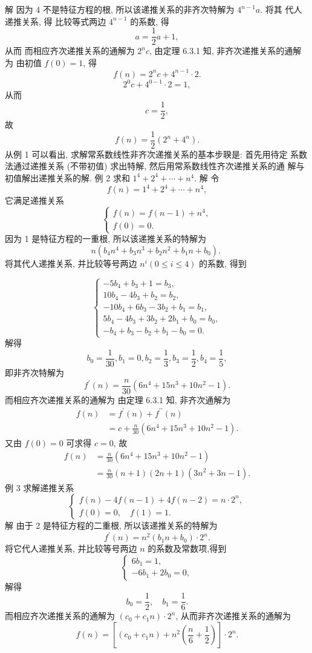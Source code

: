 \documentclass{report}
\begin{document}
解 因为 4 不是特征方程的根, 所以该递推关系的非齐次特解为 $4^{n-1} a$. 将其 代人递推关系, 得
比较等式两边 $4^{n-1}$ 的系数, 得
$$
a=\frac{1}{2} a+1,
$$
从而
而相应齐次递推关系的通解为 $2^n c$, 由定理 6.3.1 知, 非齐次递推关系的通解为 由初值 $f(0)=1$, 得
$$
f(n)=2^n c+4^{n-1} \cdot 2 .
$$
$$
2^0 c+4^{0-1} \cdot 2=1,
$$
从而
$$
c=\frac{1}{2},
$$
故
$$
f(n)=\frac{1}{2}\left(2^n+4^n\right) .
$$
从例 1 可以看出, 求解常系数线性非齐次递推关系的基本步聧是: 首先用待定 系数法通过递推关系 (不带初值) 求出特解, 然后用常系数线性齐次递推关系的通 解与初值解出递推关系的解.
例 2 求和 $1^4+2^4+\cdots+n^4$.
解 令
$$
f(n)=1^4+2^4+\cdots+n^4,
$$
它满足递推关系
$$
\left\{\begin{array}{l}
f(n)=f(n-1)+n^4, \\
f(0)=0 .
\end{array}\right.
$$
因为 1 是特征方程的一重根, 所以该递推关系的特解为
$$
n\left(b_4 n^4+b_3 n^3+b_2 n^2+b_1 n+b_0\right) \text {. }
$$
将其代人递推关系, 并比较等号两边 $n^i(0 \leqslant i \leqslant 4)$ 的系数, 得到

$$
\left\{\begin{array}{l}
	-5 b_4+b_3+1=b_3, \\
	10 b_4-4 b_3+b_2=b_2, \\
	-10 b_4+6 b_3-3 b_2+b_1=b_1, \\
	5 b_4-4 b_3+3 b_2+2 b_1+b_0=b_0, \\
	-b_4+b_3-b_2+b_1-b_0=0 .
\end{array}\right.
$$
解得
$$
b_0=\frac{1}{30}, b_1=0, b_2=\frac{1}{3}, b_3=\frac{1}{2}, b_4=\frac{1}{5},
$$
即非齐次特解为
$$
f^{\prime}(n)=\frac{n}{30}\left(6 n^4+15 n^3+10 n^2-1\right) .
$$
而相应齐次递推关系的通解为
由定理 6.3.1 知, 非齐次通解为
$$
\begin{aligned}
	f(n) &=f^{\prime}(n)+f^{\prime \prime}(n) \\
	&=c+\frac{n}{30}\left(6 n^4+15 n^3+10 n^2-1\right) .
\end{aligned}
$$
又由 $f(0)=0$ 可求得 $c=0$, 故
$$
\begin{aligned}
	f(n) &=\frac{n}{30}\left(6 n^4+15 n^3+10 n^2-1\right) \\
	&=\frac{n}{30}(n+1)(2 n+1)\left(3 n^2+3 n-1\right) .
\end{aligned}
$$
例 3 求解递推关系
$$
\left\{\begin{array}{l}
	f(n)-4 f(n-1)+4 f(n-2)=n \cdot 2^n, \\
	f(0)=0, \quad f(1)=1 .
\end{array}\right.
$$
解 由于 2 是特征方程的二重根, 所以该递推关系的特解为
$$
f^{\prime}(n)=n^2\left(b_1 n+b_0\right) \cdot 2^n .
$$
将它代人递推关系, 并比较等号两边 $n$ 的系数及常数项,得到
$$
\left\{\begin{array}{l}
	6 b_1=1, \\
	-6 b_1+2 b_0=0,
\end{array}\right.
$$
解得
$$
b_0=\frac{1}{2}, \quad b_1=\frac{1}{6} .
$$
而相应齐次递推关系的通解为 $\left(c_0+c_1 n\right) \cdot 2^n$, 从而非齐次递推关系的通解为
$$
f(n)=\left[\left(c_0+c_1 n\right)+n^2\left(\frac{n}{6}+\frac{1}{2}\right)\right] \cdot 2^n .
$$
\end{document}
